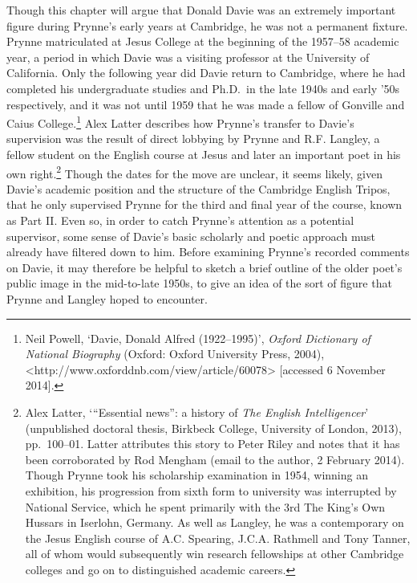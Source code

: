 \documentclass[]{article}
\begin{document}
Though this chapter will argue that Donald Davie was an extremely
important figure during Prynne’s early years at Cambridge, he was not a
permanent fixture. Prynne matriculated at Jesus College at the beginning
of the 1957–58 academic year, a period in which Davie was a visiting
professor at the University of California. Only the following year did
Davie return to Cambridge, where he had completed his undergraduate
studies and Ph.D.~in the late 1940s and early ’50s respectively, and it
was not until 1959 that he was made a fellow of Gonville and Caius
College.\footnote{Neil Powell, ‘Davie, Donald Alfred (1922–1995)’,
  \emph{Oxford Dictionary of National Biography} (Oxford: Oxford
  University Press, 2004),
  \textless{}http://www.oxforddnb.com/view/article/60078\textgreater{}
  {[}accessed 6 November 2014{]}.} Alex Latter describes how Prynne’s
transfer to Davie’s supervision was the result of direct lobbying by
Prynne and R.F. Langley, a fellow student on the English course at Jesus
and later an important poet in his own right.\footnote{Alex Latter,
  ‘“Essential news”: a history of \emph{The English Intelligencer}’
  (unpublished doctoral thesis, Birkbeck College, University of London,
  2013), pp.~100–01. Latter attributes this story to Peter Riley and
  notes that it has been corroborated by Rod Mengham (email to the
  author, 2 February 2014). Though Prynne took his scholarship
  examination in 1954, winning an exhibition, his progression from sixth
  form to university was interrupted by National Service, which he spent
  primarily with the 3rd The King’s Own Hussars in Iserlohn, Germany. As
  well as Langley, he was a contemporary on the Jesus English course of
  A.C. Spearing, J.C.A. Rathmell and Tony Tanner, all of whom would
  subsequently win research fellowships at other Cambridge colleges and
  go on to distinguished academic careers.} Though the dates for the
move are unclear, it seems likely, given Davie’s academic position and
the structure of the Cambridge English Tripos, that he only supervised
Prynne for the third and final year of the course, known as Part II.
Even so, in order to catch Prynne’s attention as a potential supervisor,
some sense of Davie’s basic scholarly and poetic approach must already
have filtered down to him. Before examining Prynne’s recorded comments
on Davie, it may therefore be helpful to sketch a brief outline of the
older poet’s public image in the mid-to-late 1950s, to give an idea of
the sort of figure that Prynne and Langley hoped to encounter.
\end{document}
